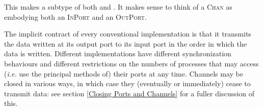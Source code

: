 \documentclass[12pt]{IOS-Book-Article-CPA-2017}
\begin{document}
This makes  a subtype of both 
and . It makes sense to think of a \textsc{Chan}
as embodying both an \textsc{InPort} and an \textsc{OutPort}.

The implicit contract of every conventional  implementation
is that it transmits the data written at its output port to its input
port in the order in which the data is written.  Different implementations
have different synchronization behaviours and different restrictions
on the numbers of processes that may access (\textit{i.e.} use the
principal methods of) their ports at any time. Channels may be
closed in various ways, in which case they
(eventually or immediately) cease to transmit data: 
see section \ref{Closing Ports and Channels} for a fuller
discussion of this.
\end{document}
